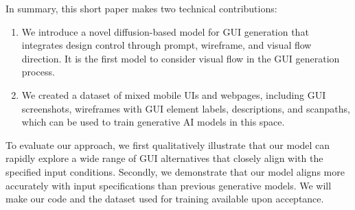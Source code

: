 \noindent In summary, this short paper makes two technical contributions:
\begin{enumerate}
\item We introduce a novel diffusion-based model for GUI generation that integrates design control through prompt, wireframe, and visual flow direction. It is the first model to consider visual flow in the GUI generation process.
\item We created a dataset of mixed mobile UIs and webpages, including GUI screenshots, wireframes with GUI element labels, descriptions, and scanpaths, which can be used to train generative AI models in this space.
\end{enumerate}

To evaluate our approach, we first qualitatively illustrate that our model can rapidly explore a wide range of GUI alternatives that closely align with the specified input conditions. Secondly, we demonstrate that our model aligns more accurately with input specifications than previous generative models. We will make our code and the dataset used for training available upon acceptance.


